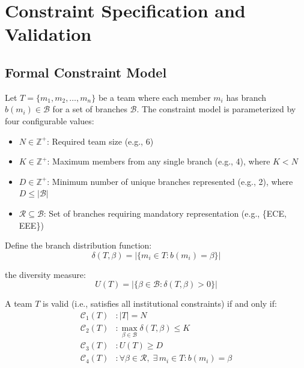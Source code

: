 \documentclass[12pt,a4paper]{article}
\begin{document}
\section{Constraint Specification and Validation}

\subsection{Formal Constraint Model}

Let $T = \{m_1, m_2, \ldots, m_n\}$ be a team where each member $m_i$ has branch $b(m_i) \in \mathcal{B}$ for a set of branches $\mathcal{B}$. The constraint model is parameterized by four configurable values:

\begin{itemize}[noitemsep,topsep=3pt]
    \item $N \in \mathbb{Z}^+$: Required team size (e.g., 6)
    \item $K \in \mathbb{Z}^+$: Maximum members from any single branch (e.g., 4), where $K < N$
    \item $D \in \mathbb{Z}^+$: Minimum number of unique branches represented (e.g., 2), where $D \leq |\mathcal{B}|$
    \item $\mathcal{R} \subseteq \mathcal{B}$: Set of branches requiring mandatory representation (e.g., \{ECE, EEE\})
\end{itemize}

Define the branch distribution function:
\begin{equation}
    \delta(T, \beta) = |\{m_i \in T : b(m_i) = \beta\}|
\end{equation}

the diversity measure:
\begin{equation}
    U(T) = |\{\beta \in \mathcal{B} : \delta(T, \beta) > 0\}|
\end{equation}

A team $T$ is valid (i.e., satisfies all institutional constraints) if and only if:
\begin{align}
    \mathcal{C}_1(T) &: |T| = N \\
    \mathcal{C}_2(T) &: \max_{\beta \in \mathcal{B}} \delta(T, \beta) \leq K \\
    \mathcal{C}_3(T) &: U(T) \geq D \\
    \mathcal{C}_4(T) &: \forall \beta \in \mathcal{R},\; \exists\, m_i \in T : b(m_i) = \beta
\end{align}
\end{document}
